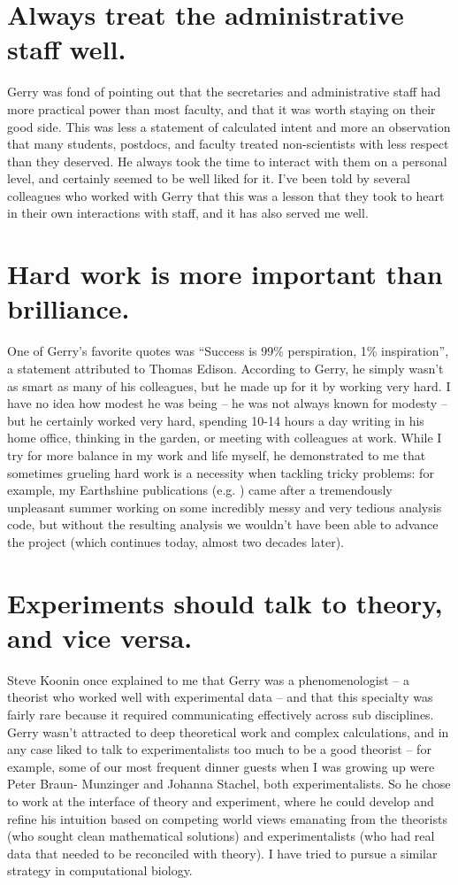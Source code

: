 \documentclass{ws-rv9x6}
\begin{document}
\section*{Always treat the administrative staff well.}

Gerry was fond of pointing out that the secretaries and administrative
staff had more practical power than most faculty, and that it was
worth staying on their good side. This was less a statement of
calculated intent and more an observation that many students,
postdocs, and faculty treated non-scientists with less respect than
they deserved. He always took the time to interact with them on a
personal level, and certainly seemed to be well liked for it. I've
been told by several colleagues who worked with Gerry that this was a
lesson that they took to heart in their own interactions with staff,
and it has also served me well.

\section*{Hard work is more important than brilliance.}

One of Gerry's favorite quotes was ``Success is 99\% perspiration, 1\%
inspiration'', a statement attributed to Thomas Edison. According to
Gerry, he simply wasn't as smart as many of his colleagues, but he
made up for it by working very hard. I have no idea how modest he was
being -- he was not always known for modesty -- but he certainly
worked very hard, spending 10-14 hours a day writing in his home
office, thinking in the garden, or meeting with colleagues at
work. While I try for more balance in my work and life myself, he
demonstrated to me that sometimes grueling hard work is a necessity
when tackling tricky problems: for example, my Earthshine
publications (e.g. \cite{goode2001earthshine}) came after a
tremendously unpleasant summer working on some incredibly messy and
very tedious analysis code, but without the resulting analysis we
wouldn't have been able to advance the project (which continues today,
almost two decades later).

\section*{Experiments should talk to theory, and vice versa.}

Steve Koonin once explained to me that Gerry was a phenomenologist -- a
theorist who worked well with experimental data -- and that this
specialty was fairly rare because it required communicating
effectively across sub disciplines. Gerry wasn't attracted to deep
theoretical work and complex calculations, and in any case liked to
talk to experimentalists too much to be a good theorist -- for example,
some of our most frequent dinner guests when I was growing up were
Peter Braun- Munzinger and Johanna Stachel, both experimentalists. So
he chose to work at the interface of theory and experiment, where he
could develop and refine his intuition based on competing world views
emanating from the theorists (who sought clean mathematical solutions)
and experimentalists (who had real data that needed to be reconciled
with theory). I have tried to pursue a similar strategy in
computational biology.
\end{document}
